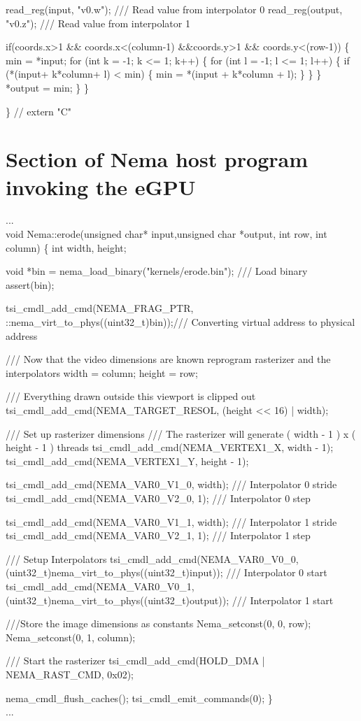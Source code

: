     read\_reg(input, "v0.w"); /// Read value from interpolator 0
    read\_reg(output, "v0.z"); /// Read value from interpolator 1
  
    if(coords.x>1 \&\& coords.x<(column-1) \&\&coords.y>1 \&\& coords.y<(row-1))
    \{
      min = *input;
      for (int k = -1; k <= 1; k++)
      \{
        for (int l = -1; l <= 1; l++)
        \{
          if (*(input+ k*column+ l) < min)
          \{
            min = *(input + k*column + l);
          \}
        \}
      \}
      *output = min;
    \}
  \}

\} // extern "C"

\section{Section of Nema host program invoking the eGPU}
\label{s:hostero}

...\\
void Nema::erode(unsigned char* input,unsigned char *output, int row, int column)
\{
  int width, height;

  void *bin = nema\_load\_binary("kernels/erode.bin"); /// Load binary
  assert(bin);

  tsi\_cmdl\_add\_cmd(NEMA\_FRAG\_PTR, ::nema\_virt\_to\_phys((uint32\_t)bin));/// Converting virtual address to physical address

  /// Now that the video dimensions are known reprogram rasterizer and the interpolators
  width  = column;
  height = row;

    /// Everything drawn outside this viewport is clipped out
  tsi\_cmdl\_add\_cmd(NEMA\_TARGET\_RESOL,  (height << 16) | width);

    /// Set up rasterizer dimensions
    /// The rasterizer will generate ( width - 1 ) x ( height - 1 ) threads
  tsi\_cmdl\_add\_cmd(NEMA\_VERTEX1\_X, width - 1);
  tsi\_cmdl\_add\_cmd(NEMA\_VERTEX1\_Y, height - 1);

  tsi\_cmdl\_add\_cmd(NEMA\_VAR0\_V1\_0, width);   /// Interpolator 0 stride
  tsi\_cmdl\_add\_cmd(NEMA\_VAR0\_V2\_0, 1);       /// Interpolator 0 step

  tsi\_cmdl\_add\_cmd(NEMA\_VAR0\_V1\_1, width);   /// Interpolator 1 stride
  tsi\_cmdl\_add\_cmd(NEMA\_VAR0\_V2\_1, 1);       /// Interpolator 1 step

  /// Setup Interpolators
  tsi\_cmdl\_add\_cmd(NEMA\_VAR0\_V0\_0, (uint32\_t)nema\_virt\_to\_phys((uint32\_t)input)); /// Interpolator 0 start
  tsi\_cmdl\_add\_cmd(NEMA\_VAR0\_V0\_1, (uint32\_t)nema\_virt\_to\_phys((uint32\_t)output)); /// Interpolator 1 start

  ///Store the image dimensions as constants
  Nema\_setconst(0, 0, row);
  Nema\_setconst(0, 1, column);

  /// Start the rasterizer
  tsi\_cmdl\_add\_cmd(HOLD\_DMA | NEMA\_RAST\_CMD, 0x02);


  nema\_cmdl\_flush\_caches();
  tsi\_cmdl\_emit\_commands(0);
\}\\
...


